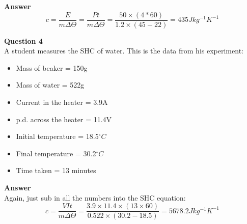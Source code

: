 \documentclass{article}
\begin{document}
\textbf{Answer}\\
\[
	c = \frac{E}{m \Delta \Theta}
	= \frac{Pt}{m \Delta \Theta}
	= \frac{50 \times (4*60)}{1.2 \times (45-22)}
	= 435 Jkg^{-1}K^{-1}
\]

\textbf{Question 4}\\
A student measures the SHC of water. This is the data from his experiment:
\begin{multicols}{2}
	\begin{itemize}
		\item	Mass of beaker = 150g
		\item Mass of water = 522g
		\item Current in the heater = 3.9A
		\item p.d. across the heater = 11.4V
		\item Initial temperature = 18.5$^{\circ}C$
		\item Final temperature = 30.2$^{\circ}C$
		\item Time taken = 13 minutes
	\end{itemize}
\end{multicols}

\textbf{Answer}\\
Again, just sub in all the numbers into the SHC equation:
\[
	c = \frac{VIt}{m \Delta \Theta}
	= \frac{3.9 \times 11.4 \times (13 \times 60)}{0.522 \times (30.2-18.5)}
	= 5678.2 Jkg^{-1}K^{-1}
\]
\end{document}
